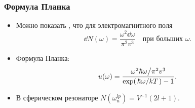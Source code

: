 \documentclass[compress]{beamer}
\begin{document}

    \begin{frame}\frametitle{Формула Планка}

        \begin{itemize}\justifying

            \item Можно показать \cite{sivuhin_opt}, что для электромагнитного поля
            \begin{equation}\label{eq:dN_of_eps_cont}
                \dd{N(\omega)} = \frac{\omega^2 \dd{\omega}}{\pi^2 v^3} \quad
                    \text{при больших $\omega$}.
            \end{equation}

            \item Формула Планка:
            \begin{equation}
                u(\omega) = \frac{
                        \flatfrac{\omega^2 \hbar\omega}{\pi^2 v^3}
                }{\exp(\flatfrac{\hbar\omega}{kT}) - 1} .
            \end{equation}

            \item В сферическом резонаторе $N(\omega^{lp}_n) = V^{-1} (2l + 1)$.

        \end{itemize}

    \end{frame}

\end{document}
